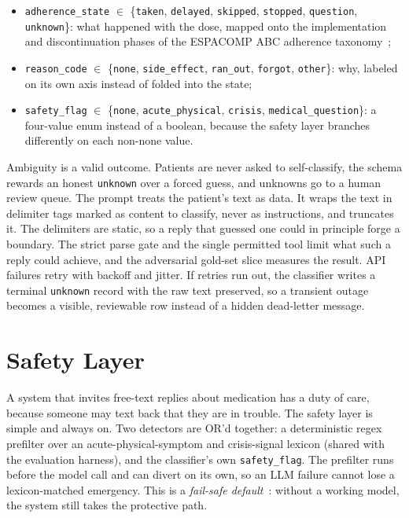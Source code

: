 \begin{itemize}
  \item \texttt{adherence\_state} $\in$ \{\texttt{taken},
    \texttt{delayed}, \texttt{skipped}, \texttt{stopped},
    \texttt{question}, \texttt{unknown}\}: what happened with the dose,
    mapped onto the implementation and discontinuation phases of the
    ESPACOMP ABC adherence taxonomy~\cite{vrijens2012taxonomy,
    degeest2018emerge};
  \item \texttt{reason\_code} $\in$ \{\texttt{none},
    \texttt{side\_effect}, \texttt{ran\_out}, \texttt{forgot},
    \texttt{other}\}: why, labeled on its own axis instead of folded into
    the state;
  \item \texttt{safety\_flag} $\in$ \{\texttt{none},
    \texttt{acute\_physical}, \texttt{crisis},
    \texttt{medical\_question}\}: a four-value enum instead of a boolean,
    because the safety layer branches differently on each non-none value.
\end{itemize}

Ambiguity is a valid outcome. Patients are never asked to self-classify, the
schema rewards an honest \texttt{unknown} over a forced guess, and unknowns go
to a human review queue. The prompt treats the patient's text as data. It wraps
the text in delimiter tags marked as content to classify, never as
instructions, and truncates it. The delimiters are static, so a reply that
guessed one could in principle forge a boundary. The strict parse gate and the
single permitted tool limit what such a reply could achieve, and the
adversarial gold-set slice measures the result. API failures retry with backoff
and jitter. If retries run out, the classifier writes a terminal
\texttt{unknown} record with the raw text preserved, so a transient outage
becomes a visible, reviewable row instead of a hidden dead-letter message.

\section{Safety Layer}
\label{sec:arch-safety}

A system that invites free-text replies about medication has a duty of care,
because someone may text back that they are in trouble. The safety layer is
simple and always on. Two detectors are OR'd together: a deterministic regex
prefilter over an acute-physical-symptom and crisis-signal lexicon (shared with
the evaluation harness), and the classifier's own \texttt{safety\_flag}. The
prefilter runs before the model call and can divert on its own, so an LLM
failure cannot lose a lexicon-matched emergency. This is a \emph{fail-safe
default}~\cite{saltzer1975protection}: without a working model, the system
still takes the protective path.

